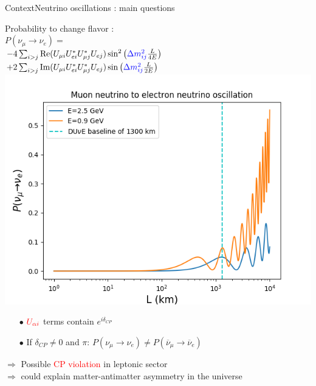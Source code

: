 \documentclass[10pt]{beamer}
\begin{document}
\begin{frame}{Context}{Neutrino oscillations : main questions}
\begin{scriptsize}
\begin{minipage}{0.48\textwidth}
	    		Probability to change flavor : \\
	    		$
		    		P(\nu_{\mu}\to\nu_e) = $ \\ 
	    		$
		    		- 4\sum_{i>j}\Re(U_{\mu i}U_{e i}^*U_{\mu j}^*U_{e j})\sin^2\left(\textcolor{blue}{\Delta m_{ij}^2}\frac{L}{4E}\right) $\\
	    		$
		    		 +2\sum_{i>j}\Im(U_{\mu i}U_{e i}^*U_{\mu j}^*U_{e j})\sin\left(\textcolor{blue}{\Delta m_{ij}^2}\frac{L}{2E}\right)
    		   $ \\
    		\includegraphics[width=\textwidth]{figures/contexte/numu-nue-vs-L-3flav.png}
    	\end{minipage}
    	\hfill
    	\begin{minipage}{0.48\textwidth}
    		\begin{itemize}
    			\item[$\bullet$] $\textcolor{red}{U_{\alpha i}}$ terms contain $e^{i\delta_{CP}}$
    			\item[$\bullet$] If $\delta_{CP} \ne 0$ and $\pi$: $P(\nu_{\mu}\to\nu_e) \ne P(\overline{\nu}_{\mu}\to\overline{\nu}_e)$
    		\end{itemize}
    		$\Rightarrow$ Possible \textcolor{red}{CP violation} in leptonic sector \\ 
    		$\Rightarrow$ could explain matter-antimatter asymmetry in the universe\\
	    	

\end{minipage}
\end{scriptsize}
\end{frame}
\end{document}
